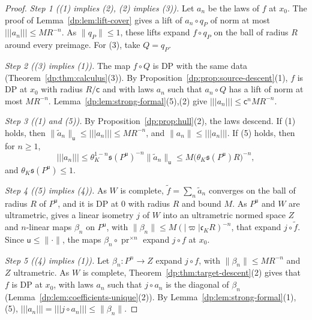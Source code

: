 \documentclass[11pt]{amsart}
\theoremstyle{definition}
\theoremstyle{remark}
\numberwithin{equation}{section}
\newcommand{\abs}[1]{\lvert #1\rvert}
\newcommand{\norm}[1]{\lVert #1\rVert}
\theoremstyle{plain}
\theoremstyle{definition}
\theoremstyle{plain}
\begin{document}
\begin{proof}
\emph{Step 1 ((1) implies (2), (2) implies (3)).} Let $a_n$ be the laws of $f$ at $x_0$. The proof of Lemma~\ref{dp:lem:lift-cover} gives a lift of $a_n\circ q_P$ of norm at most $\lvert\!\lvert\!\lvert a_n\rvert\!\rvert\!\rvert\le MR^{-n}$. As $\norm{q_P}\le1$, these lifts expand $f\circ q_P$ on the ball of radius $R$ around every preimage. For (3), take $Q=q_P$.

\emph{Step 2 ((3) implies (1)).} The map $f\circ Q$ is DP with the same data (Theorem~\ref{dp:thm:calculus}(3)). By Proposition~\ref{dp:prop:source-descent}(1), $f$ is DP at $x_0$ with radius $R/\mathsf c$ and with laws $a_n$ such that $a_n\circ Q$ has a lift of norm at most $MR^{-n}$. Lemma~\ref{dp:lem:strong-formal}(5),(2) give $\lvert\!\lvert\!\lvert a_n\rvert\!\rvert\!\rvert\le\mathsf c^nMR^{-n}$.

\emph{Step 3 ((1) and (5)).} By Proposition~\ref{dp:prop:hull}(2), the laws descend. If (1) holds, then $\norm{\tilde a_n}_{\mathsf u}\le\lvert\!\lvert\!\lvert a_n\rvert\!\rvert\!\rvert\le MR^{-n}$, and $\norm{a_n}\le\lvert\!\lvert\!\lvert a_n\rvert\!\rvert\!\rvert$. If (5) holds, then for $n\ge1$,
\[
 \lvert\!\lvert\!\lvert a_n\rvert\!\rvert\!\rvert\le\theta_K^{1-n}\mathfrak s(P^{\mathsf u})^{-n}\norm{\tilde a_n}_{\mathsf u}\le M\bigl(\theta_K\mathfrak s(P^{\mathsf u})R\bigr)^{-n},
\]
and $\theta_K\mathfrak s(P^{\mathsf u})\le1$.

\emph{Step 4 ((5) implies (4)).} As $W$ is complete, $\tilde f=\sum_n\tilde a_n$ converges on the ball of radius $R$ of $P^{\mathsf u}$, and it is DP at $0$ with radius $R$ and bound $M$. As $P^{\mathsf u}$ and $W$ are ultrametric, \cite[Theorem~14.39(1)]{I} gives a linear isometry $j$ of $W$ into an ultrametric normed space $Z$ and $n$\nobreakdash-linear maps $\beta_n$ on $P^{\mathsf u}$, with $\norm{\beta_n}\le M(\abs\varpi\mathfrak c_KR)^{-n}$, that expand $j\circ\tilde f$. Since $\mathsf u\le\norm\cdot$, the maps $\beta_n\circ\operatorname{pr}^{\times n}$ expand $j\circ f$ at $x_0$.

\emph{Step 5 ((4) implies (1)).} Let $\beta_n\colon P^n\to Z$ expand $j\circ f$, with $\norm{\beta_n}\le MR^{-n}$ and $Z$ ultrametric. As $W$ is complete, Theorem~\ref{dp:thm:target-descent}(2) gives that $f$ is DP at $x_0$, with laws $a_n$ such that $j\circ a_n$ is the diagonal of $\beta_n$ (Lemma~\ref{dp:lem:coefficients-unique}(2)). By Lemma~\ref{dp:lem:strong-formal}(1),(5), $\lvert\!\lvert\!\lvert a_n\rvert\!\rvert\!\rvert=\lvert\!\lvert\!\lvert j\circ a_n\rvert\!\rvert\!\rvert\le\norm{\beta_n}$.
\end{proof}
\end{document}
